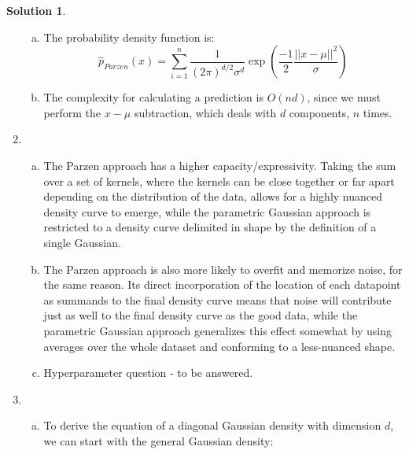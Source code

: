 \documentclass{article}
\theoremstyle{definition}
\newtheorem*{solution}{Solution}
\begin{document}
\begin{solution}
\begin{enumerate}[1.]
\begin{enumerate}[(a)]
                \item The probability density function is:
                	\begin{equation*}
                    	\hat{p}_{Parzen}(x) = \sum_{i = 1}^{n} \frac{1}{(2\pi)^{d/2}\sigma^{d}} \exp(\frac{-1}{2} \frac{||x - \mu||^2}{\sigma})
                    \end{equation*}
                    
                \item The complexity for calculating a prediction is $O(nd)$, since we must perform the $x - \mu$ subtraction, which deals with $d$ components, $n$ times. %
                    
            \end{enumerate}
        
        \item %
        	\begin{enumerate}[(a)]
            	\item The Parzen approach has a higher capacity/expressivity. Taking the sum over a set of kernels, where the kernels can be close together or far apart depending on the distribution of the data, allows for a highly nuanced density curve to emerge, while the parametric Gaussian approach is restricted to a density curve delimited in shape by the definition of a single Gaussian.
                
                \item The Parzen approach is also more likely to overfit and memorize noise, for the same reason. Its direct incorporation of the location of each datapoint as summands to the final density curve means that noise will contribute just as well to the final density curve as the good data, while the parametric Gaussian approach generalizes this effect somewhat by using averages over the whole dataset and conforming to a less-nuanced shape.
                
                \item Hyperparameter question - to be answered.
            \end{enumerate}
        
        \item %
        	\begin{enumerate}[(a)]
            	\item To derive the equation of a diagonal Gaussian density with dimension $d$, we can start with the general Gaussian density:
                

\end{enumerate}
\end{enumerate}
\end{solution}
\end{document}

